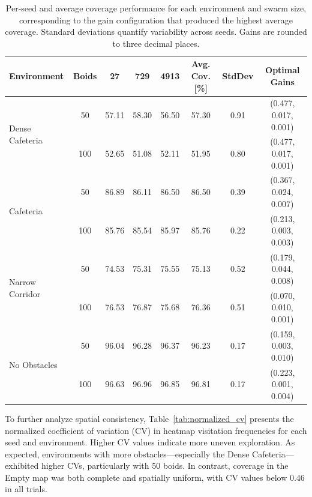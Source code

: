 \documentclass[12pt]{article}
\begin{document}
\begin{table}[H]
    \footnotesize
    \centering
    \begin{tabular}{|l|c|c|c|c|c|c|c|}
    \hline
    \textbf{Environment} & \textbf{Boids} & \textbf{27} & \textbf{729} & \textbf{4913} & \textbf{Avg. Cov. [\%]} & \textbf{StdDev} & \textbf{Optimal Gains} \\
    \hline
    \multirow{2}{*}{Dense Cafeteria} 
        & 50  & 57.11 & 58.30 & 56.50 & 57.30 & 0.91 & (0.477, 0.017, 0.001) \\
        & 100 & 52.65 & 51.08 & 52.11 & 51.95 & 0.80 & (0.477, 0.017, 0.001) \\
    \hline
    \multirow{2}{*}{Cafeteria} 
        & 50  & 86.89 & 86.11 & 86.50 & 86.50 & 0.39 & (0.367, 0.024, 0.007) \\
        & 100 & 85.76 & 85.54 & 85.97 & 85.76 & 0.22 & (0.213, 0.003, 0.003) \\
    \hline
    \multirow{2}{*}{Narrow Corridor} 
        & 50  & 74.53 & 75.31 & 75.55 & 75.13 & 0.52 & (0.179, 0.044, 0.008) \\
        & 100 & 76.53 & 76.87 & 75.68 & 76.36 & 0.51 & (0.070, 0.010, 0.001) \\
    \hline
    \multirow{2}{*}{No Obstacles} 
        & 50  & 96.04 & 96.28 & 96.37 & 96.23 & 0.17 & (0.159, 0.003, 0.010) \\
        & 100 & 96.63 & 96.96 & 96.85 & 96.81 & 0.17 & (0.223, 0.001, 0.004) \\
    \hline
    \end{tabular}
    \caption{Per-seed and average coverage performance for each environment and swarm size, corresponding to the gain configuration that produced the highest average coverage. Standard deviations quantify variability across seeds. Gains are rounded to three decimal places.}
    \label{tab:coverage_by_seed_and_optimal_gain}
\end{table}

To further analyze spatial consistency, Table~\ref{tab:normalized_cv} presents the normalized coefficient of variation (CV) in heatmap visitation frequencies for each seed and environment. Higher CV values indicate more uneven exploration. As expected, environments with more obstacles—especially the Dense Cafeteria—exhibited higher CVs, particularly with 50 boids. In contrast, coverage in the Empty map was both complete and spatially uniform, with CV values below 0.46 in all trials.
\end{document}
